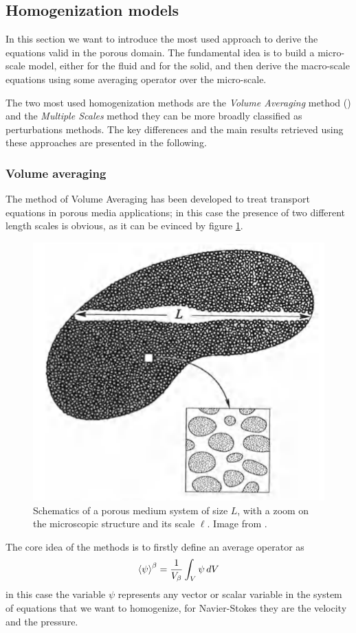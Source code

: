 \subsection{Homogenization models}

In this section we want to introduce the most used approach to derive the equations valid in the porous domain.
The fundamental idea is to build a micro-scale model, either for the fluid and for the solid, and then derive the macro-scale equations using some averaging operator over the micro-scale.

The two most used homogenization methods are the \textit{Volume Averaging} method (\citet{whitaker2013method}) and the \textit{Multiple Scales} method \citet{mei2010homogenization} they can be more broadly classified as perturbations methods. 
The key differences and the main results retrieved using these approaches are presented in the following.


\subsubsection{Volume averaging}
\label{sec:vans}

The method of Volume Averaging has been developed to treat transport equations in porous media applications; in this case the presence of two different length scales is obvious, as it can be evinced by figure \ref{fig:porsystem}.
	
	\begin{figure}[h]
		\centering
		\includegraphics[width=0.5\linewidth]{chapter_1/por_system}
		\caption{Schematics of a porous medium system of size $L$, with a zoom on the microscopic structure and its scale $\ell$. Image from \citet{whitaker2013method}.}
		\label{fig:porsystem}
	\end{figure}

The core idea of the methods is to firstly define an average operator as $${\left< \psi \right>}^{\beta} = \dfrac{1}{V_\beta} \displaystyle\int_{V} \psi \, dV$$ in this case the variable $\psi$ represents any vector or scalar variable in the system of equations that we want to homogenize, for Navier-Stokes they are the velocity and the pressure.

